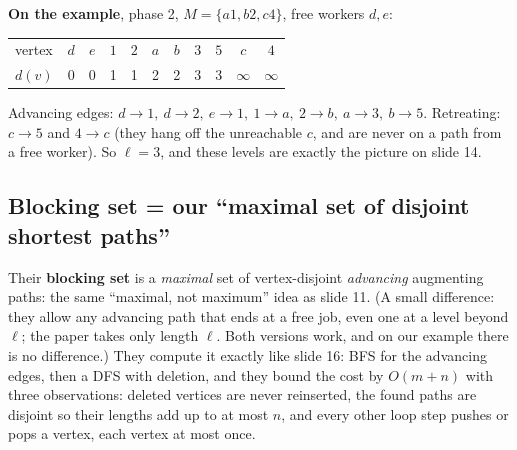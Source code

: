 \documentclass[11pt,a4paper]{article}
\begin{document}
\textbf{On the example}, phase 2, $M=\{a1,b2,c4\}$, free workers $d,e$:
\begin{center}
\begin{tabular}{@{}lcccccccccc@{}}
\toprule
vertex & $d$ & $e$ & $1$ & $2$ & $a$ & $b$ & $3$ & $5$ & $c$ & $4$\\
$d(v)$ & 0 & 0 & 1 & 1 & 2 & 2 & 3 & 3 & $\infty$ & $\infty$\\\bottomrule
\end{tabular}
\end{center}
Advancing edges: $d\!\to\!1,\ d\!\to\!2,\ e\!\to\!1,\ 1\!\to\!a,\ 2\!\to\!b,\ a\!\to\!3,\ b\!\to\!5$. Retreating: $c\!\to\!5$ and $4\!\to\!c$ (they hang off the unreachable $c$, and are never on a path from a free worker). So $\ell=3$, and these levels are exactly the picture on slide 14.

\subsection*{Blocking set = our ``maximal set of disjoint shortest paths''}
Their \textbf{blocking set} is a \emph{maximal} set of vertex-disjoint \emph{advancing} augmenting paths: the same ``maximal, not maximum'' idea as slide 11. (A small difference: they allow any advancing path that ends at a free job, even one at a level beyond $\ell$; the paper takes only length $\ell$. Both versions work, and on our example there is no difference.) They compute it exactly like slide 16: BFS for the advancing edges, then a DFS with deletion, and they bound the cost by $O(m+n)$ with three observations: deleted vertices are never reinserted, the found paths are disjoint so their lengths add up to at most $n$, and every other loop step pushes or pops a vertex, each vertex at most once.
\end{document}
